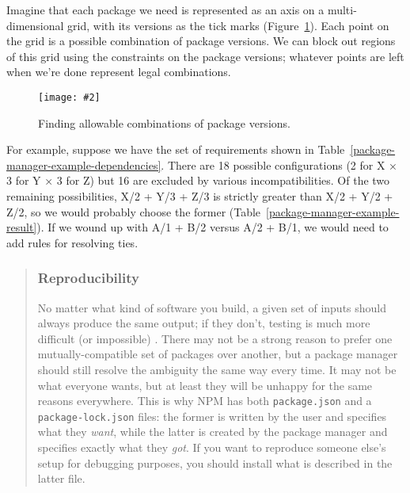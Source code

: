 \documentclass[krantzl]{krantz}
\newcommand{\figpdf}[4]{\begin{figure}%
\centering%
\texttt{[image: \#2]}%
\caption{#3}%
\label{#1}%
\end{figure}}
\newcommand{\figref}[1]{Figure~\ref{#1}}
\newcommand{\tblref}[1]{Table~\ref{#1}}
\newenvironment{callout}{\savenotes\begin{tBox}\begin{quotation}\toggletrue{inbox}\renewcommand{\thempfootnote}{\arabic{footnote}}}{\end{quotation}\vspace{\baselineskip}\end{tBox}\togglefalse{inbox}\spewnotes}
\begin{document}
Imagine that each package we need is represented as an axis on a multi-dimensional grid,
with its versions as the tick marks
(\figref{package-manager-allowable}).
Each point on the grid is a possible combination of package versions.
We can block out regions of this grid using the constraints on the package versions;
whatever points are left when we’re done represent legal combinations.

\figpdf{package-manager-allowable}{./package-manager/allowable.pdf}{Finding allowable combinations of package versions.}{0.6}


For example,
suppose we have the set of requirements shown in \tblref{package-manager-example-dependencies}.
There are 18 possible configurations
(2 for X × 3 for Y × 3 for Z)
but 16 are excluded by various incompatibilities.
Of the two remaining possibilities,
X/2 + Y/3 + Z/3 is strictly greater than X/2 + Y/2 + Z/2,
so we would probably choose the former
(\tblref{package-manager-example-result}).
If we wound up with A/1 + B/2 versus A/2 + B/1,
we would need to add rules for resolving ties.

\begin{callout}


\subsubsection*{Reproducibility}


No matter what kind of software you build,
a given set of inputs should always produce the same output;
if they don’t,
testing is much more difficult (or impossible) \cite{Taschuk2017}.
There may not be a strong reason to prefer one mutually-compatible set of packages over another,
but a package manager should still resolve the ambiguity the same way every time.
It may not be what everyone wants,
but at least they will be unhappy for the same reasons everywhere.
This is why NPM has both \texttt{package.json} and a \texttt{package-lock.json} files:
the former is written by the user and specifies what they \emph{want},
while the latter is created by the package manager and specifies exactly what they \emph{got}.
If you want to reproduce someone else’s setup for debugging purposes,
you should install what is described in the latter file.

\end{callout}
\end{document}
